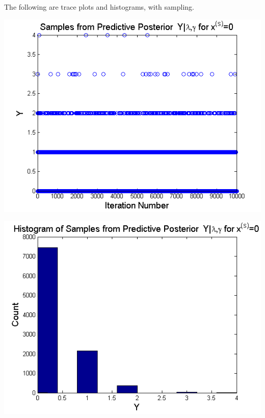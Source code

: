 \documentclass{article}
\begin{document}
\begin{description}
\noindent The following are trace plots and histograms, with sampling.\\
\begin{left}
\includegraphics[scale=0.5]{PredPostXs0.png}
\end{left}
\begin{right}
\includegraphics[scale=0.5]{HistPredPostXs0.png}\\
\end{right}


\end{description}
\end{document}

